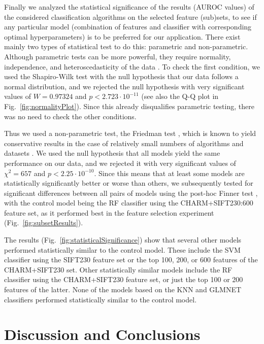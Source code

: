 Finally we analyzed the statistical significance of the results (AUROC values) of the considered classification algorithms on the selected feature (sub)sets, to see if any particular model (combination of features and classifier with corresponding optimal hyperparameters) is to be preferred for our application. There exist mainly two types of statistical test to do this: parametric and non-parametric. Although parametric tests can be more powerful, they require normality, independence, and heteroscedasticity of the data \cite{10.7717/peerj.2721}. To check the first condition, we used the Shapiro-Wilk test \cite{Shapiro-Wilk-1965} with the null hypothesis that our data follows a normal distribution, and we rejected the null hypothesis with very significant values of $W = 0.97324$ and $p < 2.723 \cdot 10^{-11}$ (see also the Q-Q plot in Fig.~\ref{fig:normalityPlot}). Since this already disqualifies parametric testing, there was no need to check the other conditions.

Thus we used a non-parametric test, the Friedman test \cite{Friedman-1940}, which is known to yield conservative results in the case of relatively small numbers of algorithms and datasets \cite{Garcia-2010}. We used the null hypothesis that all models yield the same performance on our data, and we rejected it with very significant values of $\chi^2 = 657$ and $p < 2.25 \cdot 10^{-10}$. Since this means that at least some models are statistically significantly better or worse than others, we subsequently tested for significant differences between all pairs of models using the post-hoc Finner test \cite{Finner1993}, with the control model being the RF classifier using the CHARM+SIFT230:600 feature set, as it performed best in the feature selection experiment (Fig.~\ref{fig:subsetResults}).

The results (Fig.~\ref{fig:statisticalSignificance}) show that several other models performed statistically similar to the control model. These include the SVM classifier using the SIFT230 feature set or the top 100, 200, or 600 features of the CHARM+SIFT230 set. Other statistically similar models include the RF classifier using the CHARM+SIFT230 feature set, or just the top 100 or 200 features of the latter. None of the models based on the KNN and GLMNET classifiers performed statistically similar to the control model.

\section{Discussion and Conclusions}
\label{sec:discussion}

